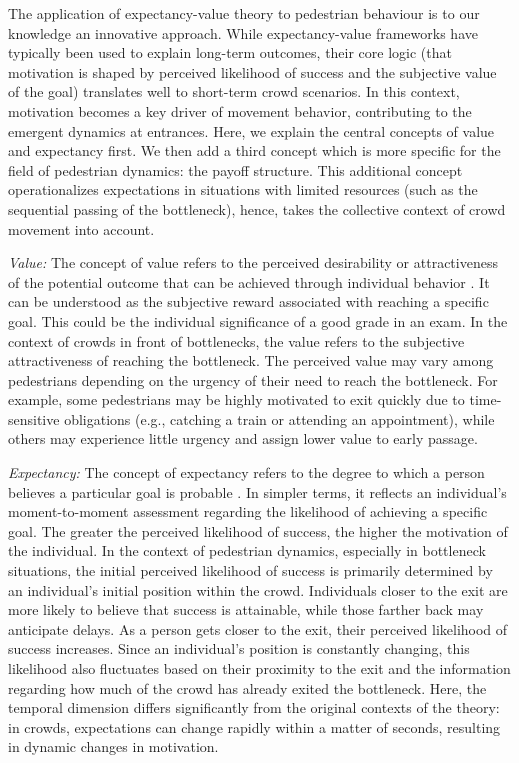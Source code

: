 \documentclass[pdflatex,sn-mathphys-num]{sn-jnl}%
\theoremstyle{thmstyleone}%
\theoremstyle{thmstyletwo}%
\theoremstyle{thmstylethree}%
\begin{document}
The application of expectancy-value theory to pedestrian behaviour is to our knowledge an innovative approach. While expectancy-value frameworks have typically been used to explain long-term outcomes, their core logic (that motivation is shaped by perceived likelihood of success and the subjective value of the goal) translates well to short-term crowd scenarios. In this context, motivation becomes a key driver of movement behavior, contributing to the emergent dynamics at entrances. Here, we explain the central concepts of value and expectancy first. We then add a third concept which is more specific for the field of pedestrian dynamics: the payoff structure. This additional concept operationalizes expectations in situations with limited resources (such as the sequential passing of the bottleneck), hence, takes the collective context of crowd movement into account.

\textit{Value:} The concept of value refers to the perceived desirability or attractiveness of the potential outcome that can be achieved through individual behavior \cite{vroom_work_1964, porter_managerial_1968}. It can be understood as the subjective reward associated with reaching a specific goal. This could be the individual significance of a good grade in an exam. In the context of crowds in front of bottlenecks, the value refers to the subjective attractiveness of reaching the bottleneck. The perceived value may vary among pedestrians depending on the urgency of their need to reach the bottleneck. For example, some pedestrians may be highly motivated to exit quickly due to time-sensitive obligations (e.g., catching a train or attending an appointment), while others may experience little urgency and assign lower value to early passage. 

\textit{Expectancy:} The concept of expectancy refers to the degree to which a person believes a particular goal is probable \cite{vroom_work_1964}. In simpler terms, it reflects an individual’s moment-to-moment assessment regarding the likelihood of achieving a specific goal. The greater the perceived likelihood of success, the higher the motivation of the individual. In the context of pedestrian dynamics, especially in bottleneck situations, the initial perceived likelihood of success is primarily determined by an individual’s initial position within the crowd. Individuals closer to the exit are more likely to believe that success is attainable, while those farther back may anticipate delays. As a person gets closer to the exit, their perceived likelihood of success increases. Since an individual’s position is constantly changing, this likelihood also fluctuates based on their proximity to the exit and the information regarding how much of the crowd has already exited the bottleneck. Here, the temporal dimension differs significantly from the original contexts of the theory: in crowds, expectations can change rapidly within a matter of seconds, resulting in dynamic changes in motivation. 
\end{document}
